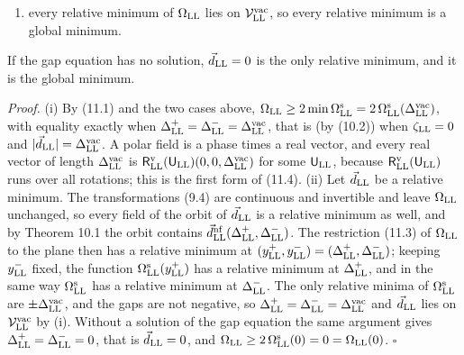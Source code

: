 \documentclass[
  10pt,
]{article}
\providecommand{\tightlist}{%
  \setlength{\itemsep}{0pt}\setlength{\parskip}{0pt}}
\begin{document}
\begin{enumerate}
\def\labelenumi{(\roman{enumi})}
\setcounter{enumi}{1}
\tightlist
\item
  every relative minimum of \(\Omega_{\rm LL}\) lies on
  \(\mathcal V^{\rm vac}_{\rm LL}\), so every relative minimum is a
  global minimum.
\end{enumerate}

If the gap equation has no solution, \(\vec d_{\rm LL}=0\) is the only
relative minimum, and it is the global minimum.

\emph{Proof.} (i) By (11.1) and the two cases above,
\(\Omega_{\rm LL}\ge2\min\Omega^{\rm s}_{\rm LL}=2\,\Omega^{\rm s}_{\rm LL}(\Delta^{\rm vac}_{\rm LL})\),
with equality exactly when
\(\Delta^+_{\rm LL}=\Delta^-_{\rm LL}=\Delta^{\rm vac}_{\rm LL}\), that
is (by (10.2)) when \(\zeta_{\rm LL}=0\) and
\(\lvert\vec d_{\rm LL}\rvert=\Delta^{\rm vac}_{\rm LL}\). A polar field
is a phase times a real vector, and every real vector of length
\(\Delta^{\rm vac}_{\rm LL}\) is
\(\mathsf R^{\rm v}_{\rm LL}(\mathsf U_{\rm LL})(0,0,\Delta^{\rm vac}_{\rm LL})\)
for some \(\mathsf U_{\rm LL}\), because
\(\mathsf R^{\rm v}_{\rm LL}(\mathsf U_{\rm LL})\) runs over all
rotations; this is the first form of (11.4). (ii) Let
\(\vec d_{\rm LL}\) be a relative minimum. The transformations (9.4) are
continuous and invertible and leave \(\Omega_{\rm LL}\) unchanged, so
every field of the orbit of \(\vec d_{\rm LL}\) is a relative minimum as
well, and by Theorem 10.1 the orbit contains
\(\vec d^{\rm nf}_{\rm LL}(\Delta^+_{\rm LL},\Delta^-_{\rm LL})\). The
restriction (11.3) of \(\Omega_{\rm LL}\) to the plane then has a
relative minimum at
\((y^+_{\rm LL},y^-_{\rm LL})=(\Delta^+_{\rm LL},\Delta^-_{\rm LL})\);
keeping \(y^-_{\rm LL}\) fixed, the function
\(\Omega^{\rm s}_{\rm LL}(y^+_{\rm LL})\) has a relative minimum at
\(\Delta^+_{\rm LL}\), and in the same way \(\Omega^{\rm s}_{\rm LL}\)
has a relative minimum at \(\Delta^-_{\rm LL}\). The only relative
minima of \(\Omega^{\rm s}_{\rm LL}\) are
\(\pm\Delta^{\rm vac}_{\rm LL}\), and the gaps are not negative, so
\(\Delta^+_{\rm LL}=\Delta^-_{\rm LL}=\Delta^{\rm vac}_{\rm LL}\) and
\(\vec d_{\rm LL}\) lies on \(\mathcal V^{\rm vac}_{\rm LL}\) by (i).
Without a solution of the gap equation the same argument gives
\(\Delta^+_{\rm LL}=\Delta^-_{\rm LL}=0\), that is
\(\vec d_{\rm LL}=0\), and
\(\Omega_{\rm LL}\ge2\,\Omega^{\rm s}_{\rm LL}(0)=0=\Omega_{\rm LL}(0)\).
\(\square\)
\end{document}
